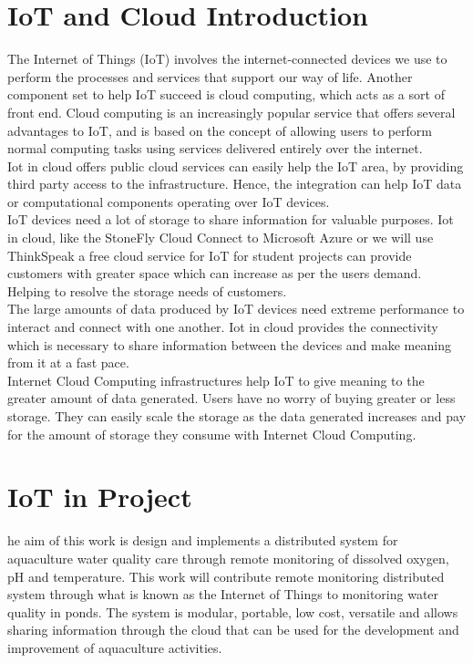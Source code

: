 \section{IoT and Cloud Introduction}
The Internet of Things (IoT) involves the internet-connected devices we use to perform the processes and services that support our way of life. Another component set to help IoT succeed is cloud computing, which acts as a sort of front end. Cloud computing is an increasingly popular service that offers several advantages to IoT, and is based on the concept of allowing users to perform normal computing tasks using services delivered entirely over the internet.\\

Iot in cloud offers public cloud services can easily help the IoT area, by providing third party access to the infrastructure. Hence, the integration can help IoT data or computational components operating over IoT devices.\\

IoT devices need a lot of storage to share information for valuable purposes. Iot in cloud, like the StoneFly Cloud Connect to Microsoft Azure or we will use ThinkSpeak a free cloud service for IoT for student projects can provide customers with greater space which can increase as per the users demand. Helping to resolve the storage needs of customers.\\

The large amounts of data produced by IoT devices need extreme performance to interact and connect with one another. Iot in cloud provides the connectivity which is necessary to share information between the devices and make meaning from it at a fast pace.\\

Internet Cloud Computing infrastructures help IoT to give meaning to the greater amount of data generated. Users have no worry of buying greater or less storage. They can easily scale the storage as the data generated increases and pay for the amount of storage they consume with Internet Cloud Computing.




\section{IoT in Project}
he aim of this work is design and implements a distributed system for aquaculture water quality care through remote monitoring of dissolved oxygen, pH and temperature. This work will contribute remote monitoring distributed system through what is known as the Internet of Things to monitoring water quality in ponds. The system is modular, portable, low cost, versatile and allows sharing information through the cloud that can be used for the development and improvement of aquaculture activities. \\

